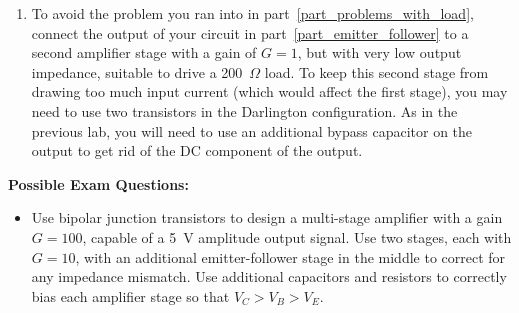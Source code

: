 \begin{enumerate}[wide]
\item To avoid the problem you ran into in part~\ref{part_problems_with_load}, connect the output of your circuit in part~\ref{part_emitter_follower} to a second amplifier stage with a gain of $G=1$, but with very low output impedance, suitable to drive a 200~$\Omega$ load.  To keep this second stage from drawing too much input current (which would affect the first stage), you may need to use two transistors in the Darlington configuration.  As in the previous lab, you will need to use an additional bypass capacitor on the output to get rid of the DC component of the output.


\end{enumerate}

\pagebreak[3]
\textbf{Possible Exam Questions:}

\begin{itemize}

\item Use bipolar junction transistors to design a multi-stage amplifier with a gain $G=100$, capable of a 5~V amplitude output signal.  Use two stages, each with $G=10$, with an additional emitter-follower stage in the middle to correct for any impedance mismatch.  Use additional capacitors and resistors to correctly bias each amplifier stage so that $V_C > V_B > V_E$.

\end{itemize}




